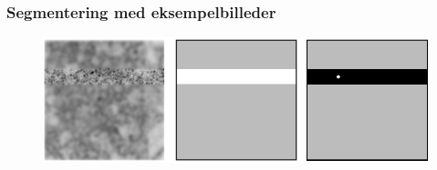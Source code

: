 \documentclass[12pt,t]{beamer}
\begin{document}
\begin{frame}
\frametitle{Segmentering med eksempelbilleder}
\begin{figure}[H]
\includegraphics[scale=0.35]{img/afstand/16.png}
\end{figure}
\end{frame}



\end{document}
